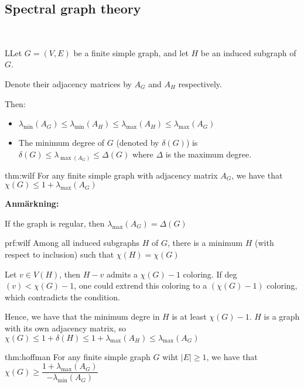 \subsection{Spectral graph theory}\hfill\\\par
\begin{lem}
  LLet $G = (V,E)$ be a finite simple graph, and let $H$ be an induced subgraph of $G$.\par
  \noindent Denote their adjacency matrices by $A_G$ and $A_H$ respectively.\par
  \noindent Then:\par
  \begin{itemize}
    \item $\lambda_{\min}(A_G)\leq\lambda_{\min}(A_H)\leq\lambda_{\max}(A_H)\leq\lambda_{\max}(A_G)$
    \item The minimum degree of $G$ (denoted by $\delta(G)$) is $\delta(G)\leq \lambda_{\max(A_G)}\leq\Delta(G)$ where $\Delta$ is the maximum degree.
  \end{itemize}
\end{lem}
\par\bigskip
\begin{theo}[Wilf]{thm:wilf}
  For any finite simple graph with adjacency matrix $A_G$, we have that $\chi(G)\leq 1+\lambda_{\max}(A_G)$
\end{theo}
\par\bigskip
\noindent\textbf{Anmärkning:}\par
\noindent If the graph is regular, then $\lambda_{\max}(A_G) = \Delta(G)$
\par\bigskip
\begin{prf}[Wilf]{prf:wilf}
  Among all induced subgraphs $H$ of $G$, there is a minimum $H$ (with respect to inclusion) such that $\chi(H) = \chi(G)$\par
  \noindent Let $v\in V(H)$, then $H-v$ admits a $\chi(G)-1$ coloring. If deg$(v)<\chi(G)-1$, one could extrend this coloring to a $(\chi(G)-1)$ coloring, which contradicts the condition.
  \par\bigskip
  \noindent Hence, we have that the minimum degre in $H$ is at least $\chi(G)-1$. $H$ is a graph with its own adjacency matrix, so $\chi(G)\leq 1+\delta(H)\leq1+\lambda_{\max}(A_H)\leq\lambda_{\max}(A_G)$
\end{prf}
\par\bigskip
\begin{theo}[Hoffman]{thm:hoffman}
  For any finite simple graph $G$ wiht $\left|E\right|\geq1$, we have that $\chi(G)\geq\dfrac{1+\lambda_{\max}(A_G)}{-\lambda_{\min}(A_G)}$
\end{theo}
